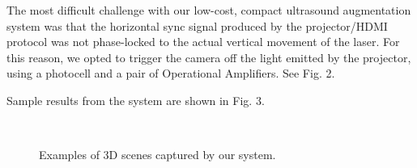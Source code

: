 \documentclass{llncs}
\begin{document}
The most difficult challenge with our low-cost, compact ultrasound augmentation system was that the horizontal sync signal produced by the projector/HDMI protocol was not phase-locked to the actual vertical movement of the laser. For this reason, we opted to trigger the camera off the light emitted by the projector, using a photocell and a pair of Operational Amplifiers.  See Fig. 2.

Sample results from the system are shown in Fig. 3.

\begin{figure}[h]
\centering
{}\hfill%
\\
\caption{
Examples of 3D scenes captured by our system.
}
\end{figure}
\end{document}
